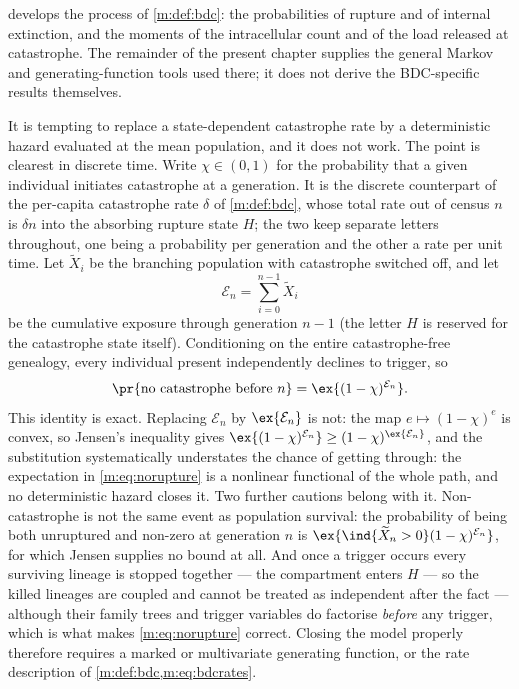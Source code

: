  develops the
process of \cref{m:def:bdc}: the probabilities of
rupture and of internal extinction, and the moments of the intracellular count
and of the load released at catastrophe. The remainder of the present chapter
supplies the general Markov and generating-function tools used there; it does not
derive the BDC-specific results themselves.

\begin{remark}
\label{m:rem:notmeanfield}
It is tempting to replace a state-dependent catastrophe rate by a deterministic
hazard evaluated at the mean population, and it does not work. The point is
clearest in discrete time. Write $\chi\in(0,1)$ for the probability that a given
individual initiates catastrophe at a generation. It is the discrete counterpart
of the per-capita catastrophe rate $\delta$ of \cref{m:def:bdc}, whose total rate
out of census $n$ is $\delta n$ into the absorbing rupture state $H$; the two
keep separate letters throughout, one being a probability per generation and the
other a rate per unit time. Let
$\widetilde X_i$ be the branching population with catastrophe switched off, and
let
\begin{equation*}
\mathcal{E}_n = \sum_{i=0}^{n-1}\widetilde X_i
\end{equation*}
be the cumulative exposure through generation $n-1$ (the letter $H$ is reserved
for the catastrophe state itself). Conditioning on the entire catastrophe-free
genealogy, every individual present independently declines to trigger, so
\begin{equation}
\label{m:eq:norupture}
\pr{\text{no catastrophe before }n} = \ex{(1-\chi)^{\mathcal{E}_n}} .
\end{equation}
This identity is exact. Replacing $\mathcal{E}_n$ by $\ex{\mathcal{E}_n}$ is not:
the map $e\mapsto(1-\chi)^e$ is convex, so Jensen's inequality gives
$\ex{(1-\chi)^{\mathcal{E}_n}}\ge(1-\chi)^{\ex{\mathcal{E}_n}}$, and the
substitution systematically understates the chance of getting through: the
expectation in \cref{m:eq:norupture} is a nonlinear functional of the whole path,
and no deterministic hazard closes it.
Two further cautions belong with it. Non-catastrophe is not the same event as
population survival: the probability of being both unruptured and non-zero at
generation $n$ is $\ex{\ind\{\widetilde X_n>0\}(1-\chi)^{\mathcal{E}_n}}$, for
which Jensen supplies no bound at all. And once a trigger occurs every surviving
lineage is stopped together --- the compartment enters $H$ --- so the killed
lineages are coupled and cannot be treated as independent after the fact ---
although their family trees and trigger variables do factorise \emph{before} any
trigger, which is what makes \cref{m:eq:norupture} correct. Closing the model
properly therefore requires a marked or multivariate generating function, or the
rate description of \cref{m:def:bdc,m:eq:bdcrates}.
\end{remark}

